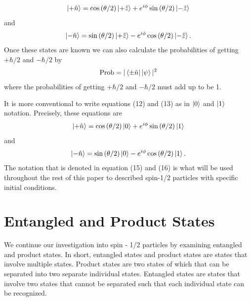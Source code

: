 \documentclass[twocolumn]{article}
\begin{document}
\begin{equation}
\ket{+\hat{n}}=\cos{(\theta/2)}\ket{+\hat{z}}+e^{i\phi}\sin{(\theta/2)}\ket{-\hat{z}}
\end{equation}
and
\begin{equation}
\ket{-\hat{n}}=\sin{(\theta/2)}\ket{+\hat{z}}-e^{i\phi}\cos{(\theta/2)}\ket{-\hat{z}}.
\end{equation}
Once these states are known we can also calculate the probabilities of getting $+\hbar/2$ and $-\hbar/2$ by
\begin{equation}
\text{Prob}=|\bra{\pm\hat{n}}\ket{\psi}|^2
\end{equation}
where the probabilities of getting $+\hbar/2$ and $-\hbar/2$ must add up to be 1.

It is more conventional to write equations (12) and (13) as in $\ket{0}$ and $\ket{1}$ notation. Precisely, these equations are
\begin{equation}
\ket{+\hat{n}}=\cos{(\theta/2)}\ket{0}+e^{i\phi}\sin{(\theta/2)}\ket{1}
\end{equation}
and
\begin{equation}
\ket{-\hat{n}}=\sin{(\theta/2)}\ket{0}-e^{i\phi}\cos{(\theta/2)}\ket{1}.
\end{equation}
The notation that is denoted in equation (15) and (16) is what will be used throughout the rest of this paper to described spin-1/2 particles with specific initial conditions.
\section*{Entangled and Product States}
We continue our investigation into spin - 1/2 particles by examining entangled and product states. In short, entangled states and product states are states that involve multiple states. Product states are two states of which that can be separated into two separate individual states. Entangled states are states that involve two states that cannot be separated such that each individual state can be recognized.
\end{document}
